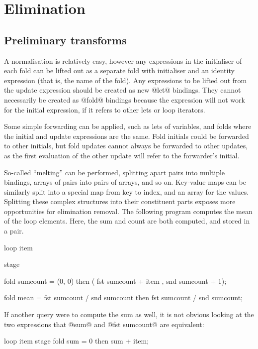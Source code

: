 \section{Elimination}
\label{s:Elimination}

\subsection{Preliminary transforms}

A-normalisation is relatively easy, however any expressions in the initialiser of each fold can be lifted out as a separate fold with initialiser and an identity expression (that is, the name of the fold).
Any expressions to be lifted out from the update expression should be created as new @let@ bindings.
They cannot necessarily be created as @fold@ bindings because the expression will not work for the initial expression, if it refers to other lets or loop iterators.

Some simple forwarding can be applied, such as lets of variables, and folds where the initial and update expressions are the same.
Fold initials could be forwarded to other initials, but fold updates cannot always be forwarded to other updates, as the first evaluation of the other update will refer to the forwarder's initial.

So-called ``melting'' can be performed, splitting apart pairs into multiple bindings, arrays of pairs into pairs of arrays, and so on.
Key-value maps can be similarly split into a special map from key to index, and an array for the values.
Splitting these complex structures into their constituent parts exposes more opportunities for elimination removal.
The following program computes the mean of the loop elements. Here, the sum and count are both computed, and stored in a pair.

\begin{code}
loop item {
  stage {
    fold sumcount
     = (0, 0)
     then
       ( fst sumcount + item
       , snd sumcount + 1);

    fold mean
     = fst sumcount / snd sumcount
     then
       fst sumcount / snd sumcount;
  }
}
\end{code}

If another query were to compute the sum as well, it is not obvious looking at the two expressions that @sum@ and @fst sumcount@ are equivalent:
\begin{code}
loop item {
  stage {
    fold sum
     = 0
     then
       sum + item;
  }
}
\end{code}

